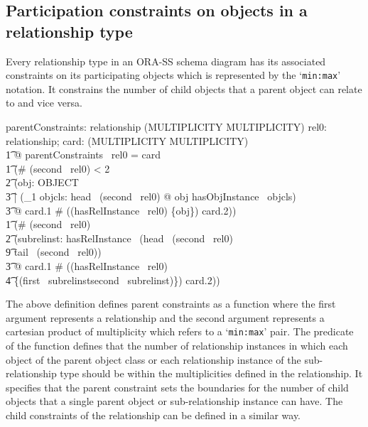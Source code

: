 \documentclass{entcs}
\begin{document}
\subsection{Participation constraints on objects in a relationship type}
Every relationship type in an ORA-SS schema diagram has its
associated constraints on its participating objects which is
represented by the `\texttt{min:max}' notation. It constrains the
number of child objects that a parent object can relate to and
vice versa.
\begin{small}
\begin{axdef}
  parentConstraints: relationship \fun (MULTIPLICITY \cross MULTIPLICITY)
  \where
  \forall  rel0: relationship; card: (MULTIPLICITY \cross  MULTIPLICITY) \\
  \t1 @ parentConstraints~ rel0 = card \\
  \t1 \iff  (\# (second~ rel0) < 2 \\
  \t2 \implies  (\forall  obj: OBJECT \\
  \t3 | (\exists _1{} objcls: head~ (second~ rel0) @ obj \in  hasObjInstance~ objcls) \\
  \t3 @ card.1 \leq  \# ((hasRelInstance~ rel0) \rres  \{\langle obj\rangle \}) \leq card.2)) \\
  \t1 \land  (\# (second~ rel0)  \\
  \t2 \implies  (\forall  subrelinst: hasRelInstance~ (head~ (second~ rel0) \\
  \t9 \mapsto  tail~ (second~ rel0)) \\
  \t3 @ card.1 \leq  \# ((hasRelInstance~ rel0) \\
  \t4 \rres  \{(\langle first~ subrelinst\rangle  \cat  second~ subrelinst)\}) \leq  card.2))
\end{axdef}
\end{small}
The above definition defines parent constraints as a function
where the first argument represents a relationship and the second
argument represents a cartesian product of multiplicity which
refers to a `\texttt{min:max}' pair. The predicate of the function
defines that the number of relationship instances in which each
object of the parent object class or each relationship instance of
the sub-relationship type should be within the multiplicities
defined in the relationship. It specifies that the parent
constraint sets the boundaries for the number of child objects
that a single parent object or sub-relationship instance can have.
The child constraints of the relationship can be defined in a
similar way.
\end{document}
